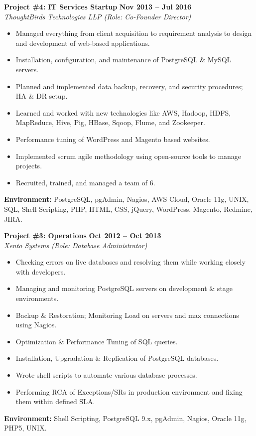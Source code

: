 \documentclass[10pt,a4paper]{article}
\begin{document}
\noindent
\begin{minipage}{\textwidth}
    \textbf{\large Project \#4: IT Services Startup} \hfill \textbf{Nov 2013 -- Jul 2016} \\
    \textit{ThoughtBirds Technologies LLP (Role: Co-Founder Director)}
    \begin{itemize}[leftmargin=*, noitemsep, topsep=2pt]
        \item Managed everything from client acquisition to requirement analysis to design and development of web-based applications.
        \item Installation, configuration, and maintenance of PostgreSQL \& MySQL servers.
        \item Planned and implemented data backup, recovery, and security procedures; HA & DR setup.
        \item Learned and worked with new technologies like AWS, Hadoop, HDFS, MapReduce, Hive, Pig, HBase, Sqoop, Flume, and Zookeeper.
        \item Performance tuning of WordPress and Magento based websites.
        \item Implemented scrum agile methodology using open-source tools to manage projects.
        \item Recruited, trained, and managed a team of 6.
    \end{itemize}
    \small{\textbf{Environment:} PostgreSQL, pgAdmin, Nagios, AWS Cloud, Oracle 11g, UNIX, SQL, Shell Scripting, PHP, HTML, CSS, jQuery, WordPress, Magento, Redmine, JIRA.}
\end{minipage}
\vspace{10pt}

\noindent
\begin{minipage}{\textwidth}
    \textbf{\large Project \#3: Operations} \hfill \textbf{Oct 2012 -- Oct 2013} \\
    \textit{Xento Systems (Role: Database Administrator)}
    \begin{itemize}[leftmargin=*, noitemsep, topsep=2pt]
        \item Checking errors on live databases and resolving them while working closely with developers.
        \item Managing and monitoring PostgreSQL servers on development \& stage environments.
        \item Backup \& Restoration; Monitoring Load on servers and max connections using Nagios.
        \item Optimization \& Performance Tuning of SQL queries.
        \item Installation, Upgradation \& Replication of PostgreSQL databases.
        \item Wrote shell scripts to automate various database processes.
        \item Performing RCA of Exceptions/SRs in production environment and fixing them within defined SLA.
    \end{itemize}
    \small{\textbf{Environment:} Shell Scripting, PostgreSQL 9.x, pgAdmin, Nagios, Oracle 11g, PHP5, UNIX.}
\end{minipage}
\vspace{10pt}
\end{document}
